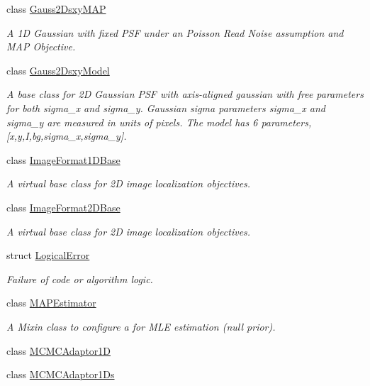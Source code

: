 \begin{DoxyCompactItemize}
class \hyperlink{classmappel_1_1Gauss2DsxyMAP}{Gauss2\+Dsxy\+M\+AP}
\begin{DoxyCompactList}\small\item\em A 1D Gaussian with fixed P\+SF under an Poisson Read Noise assumption and M\+AP Objective. \end{DoxyCompactList}\item 
class \hyperlink{classmappel_1_1Gauss2DsxyModel}{Gauss2\+Dsxy\+Model}
\begin{DoxyCompactList}\small\item\em A base class for 2D Gaussian P\+SF with axis-\/aligned gaussian with free parameters for both sigma\+\_\+x and sigma\+\_\+y. Gaussian sigma parameters sigma\+\_\+x and sigma\+\_\+y are measured in units of pixels. The model has 6 parameters, \mbox{[}x,y,I,bg,sigma\+\_\+x,sigma\+\_\+y\mbox{]}. \end{DoxyCompactList}\item 
class \hyperlink{classmappel_1_1ImageFormat1DBase}{Image\+Format1\+D\+Base}
\begin{DoxyCompactList}\small\item\em A virtual base class for 2D image localization objectives. \end{DoxyCompactList}\item 
class \hyperlink{classmappel_1_1ImageFormat2DBase}{Image\+Format2\+D\+Base}
\begin{DoxyCompactList}\small\item\em A virtual base class for 2D image localization objectives. \end{DoxyCompactList}\item 
struct \hyperlink{structmappel_1_1LogicalError}{Logical\+Error}
\begin{DoxyCompactList}\small\item\em Failure of code or algorithm logic. \end{DoxyCompactList}\item 
class \hyperlink{classmappel_1_1MAPEstimator}{M\+A\+P\+Estimator}
\begin{DoxyCompactList}\small\item\em A Mixin class to configure a for M\+LE estimation (null prior). \end{DoxyCompactList}\item 
class \hyperlink{classmappel_1_1MCMCAdaptor1D}{M\+C\+M\+C\+Adaptor1D}
\item 
class \hyperlink{classmappel_1_1MCMCAdaptor1Ds}{M\+C\+M\+C\+Adaptor1\+Ds}
\item 

\end{DoxyCompactItemize}
